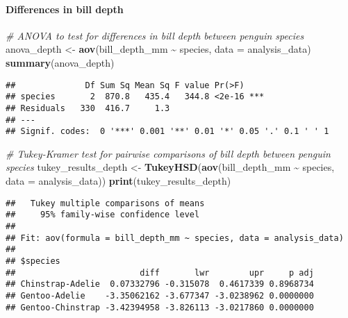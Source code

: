 \documentclass[
]{article}
\newenvironment{Shaded}{\begin{snugshade}}{\end{snugshade}}
\newcommand{\AttributeTok}[1]{\textcolor[rgb]{0.13,0.29,0.53}{#1}}
\newcommand{\CommentTok}[1]{\textcolor[rgb]{0.56,0.35,0.01}{\textit{#1}}}
\newcommand{\FunctionTok}[1]{\textcolor[rgb]{0.13,0.29,0.53}{\textbf{#1}}}
\newcommand{\NormalTok}[1]{#1}
\newcommand{\OtherTok}[1]{\textcolor[rgb]{0.56,0.35,0.01}{#1}}
\newcommand{\SpecialCharTok}[1]{\textcolor[rgb]{0.81,0.36,0.00}{\textbf{#1}}}
\begin{document}
\paragraph{Differences in bill depth}\label{differences-in-bill-depth}

\begin{Shaded}
\begin{Highlighting}[]
\CommentTok{\# ANOVA to test for differences in bill depth between penguin species}
\NormalTok{anova\_depth }\OtherTok{\textless{}{-}} \FunctionTok{aov}\NormalTok{(bill\_depth\_mm }\SpecialCharTok{\textasciitilde{}}\NormalTok{ species, }\AttributeTok{data =}\NormalTok{ analysis\_data)}
\FunctionTok{summary}\NormalTok{(anova\_depth)}
\end{Highlighting}
\end{Shaded}

\begin{verbatim}
##              Df Sum Sq Mean Sq F value Pr(>F)    
## species       2  870.8   435.4   344.8 <2e-16 ***
## Residuals   330  416.7     1.3                   
## ---
## Signif. codes:  0 '***' 0.001 '**' 0.01 '*' 0.05 '.' 0.1 ' ' 1
\end{verbatim}

\begin{Shaded}
\begin{Highlighting}[]
\CommentTok{\# Tukey{-}Kramer test for pairwise comparisons of bill depth between penguin species}
\NormalTok{tukey\_results\_depth }\OtherTok{\textless{}{-}} \FunctionTok{TukeyHSD}\NormalTok{(}\FunctionTok{aov}\NormalTok{(bill\_depth\_mm }\SpecialCharTok{\textasciitilde{}}\NormalTok{ species, }\AttributeTok{data =}\NormalTok{ analysis\_data))}
\FunctionTok{print}\NormalTok{(tukey\_results\_depth)}
\end{Highlighting}
\end{Shaded}

\begin{verbatim}
##   Tukey multiple comparisons of means
##     95% family-wise confidence level
## 
## Fit: aov(formula = bill_depth_mm ~ species, data = analysis_data)
## 
## $species
##                         diff       lwr        upr     p adj
## Chinstrap-Adelie  0.07332796 -0.315078  0.4617339 0.8968734
## Gentoo-Adelie    -3.35062162 -3.677347 -3.0238962 0.0000000
## Gentoo-Chinstrap -3.42394958 -3.826113 -3.0217860 0.0000000
\end{verbatim}
\end{document}
